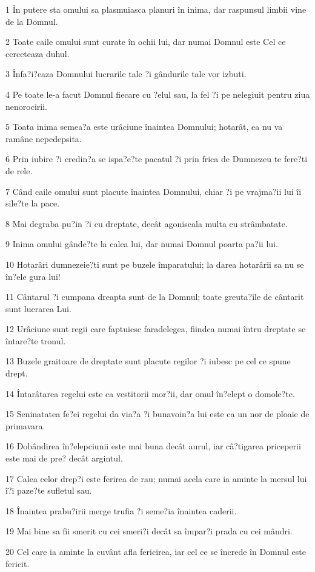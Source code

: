 \par 1 În putere sta omului sa plasmuiasca planuri în inima, dar raspunsul limbii vine de la Domnul.
\par 2 Toate caile omului sunt curate în ochii lui, dar numai Domnul este Cel ce cerceteaza duhul.
\par 3 Înfa?i?eaza Domnului lucrarile tale ?i gândurile tale vor izbuti.
\par 4 Pe toate le-a facut Domnul fiecare cu ?elul sau, la fel ?i pe nelegiuit pentru ziua nenorocirii.
\par 5 Toata inima semea?a este urâciune înaintea Domnului; hotarât, ea nu va ramâne nepedepsita.
\par 6 Prin iubire ?i credin?a se ispa?e?te pacatul ?i prin frica de Dumnezeu te fere?ti de rele.
\par 7 Când caile omului sunt placute înaintea Domnului, chiar ?i pe vrajma?ii lui îi sile?te la pace.
\par 8 Mai degraba pu?in ?i cu dreptate, decât agoniseala multa cu strâmbatate.
\par 9 Inima omului gânde?te la calea lui, dar numai Domnul poarta pa?ii lui.
\par 10 Hotarâri dumnezeie?ti sunt pe buzele împaratului; la darea hotarârii sa nu se în?ele gura lui!
\par 11 Cântarul ?i cumpana dreapta sunt de la Domnul; toate greuta?ile de cântarit sunt lucrarea Lui.
\par 12 Urâciune sunt regii care faptuiesc faradelegea, fiindca numai întru dreptate se întare?te tronul.
\par 13 Buzele graitoare de dreptate sunt placute regilor ?i iubesc pe cel ce spune drept.
\par 14 Întarâtarea regelui este ca vestitorii mor?ii, dar omul în?elept o domole?te.
\par 15 Seninatatea fe?ei regelui da via?a ?i bunavoin?a lui este ca un nor de ploaie de primavara.
\par 16 Dobândirea în?elepciunii este mai buna decât aurul, iar câ?tigarea priceperii este mai de pre? decât argintul.
\par 17 Calea celor drep?i este ferirea de rau; numai acela care ia aminte la mersul lui î?i paze?te sufletul sau.
\par 18 Înaintea prabu?irii merge trufia ?i seme?ia înaintea caderii.
\par 19 Mai bine sa fii smerit cu cei smeri?i decât sa împar?i prada cu cei mândri.
\par 20 Cel care ia aminte la cuvânt afla fericirea, iar cel ce se încrede în Domnul este fericit.
